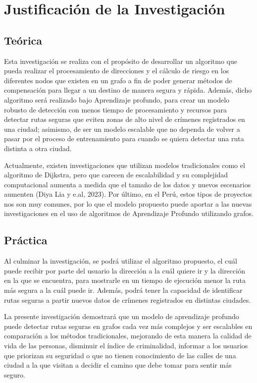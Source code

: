 \section{Justificación de la Investigación}

\subsection{Teórica}
Esta investigación se realiza con el propósito de desarrollar un algoritmo que pueda realizar el procesamiento de direcciones y el cálculo de riesgo en los diferentes nodos que existen en un grafo a fin de poder generar métodos de compensación para llegar a un destino de manera segura y rápida. Además, dicho algoritmo será realizado bajo Aprendizaje profundo, para crear un modelo robusto de detección con menos tiempo de procesamiento y recursos para detectar rutas seguras que eviten zonas de alto nivel de crímenes registrados en una ciudad; asimismo, de ser un modelo escalable que no dependa de volver a pasar por el proceso de entrenamiento para cuando se quiera detectar una ruta distinta a otra ciudad.

Actualmente, existen investigaciones que utilizan modelos tradicionales como el algoritmo de Dijkstra, pero que carecen de escalabilidad y su complejidad computacional aumenta a medida que el tamaño de los datos y nuevos escenarios aumenten (Diya Lia y e.al, 2023). Por último, en el Perú, estos tipos de proyectos nos son muy comunes, por lo que el modelo propuesto puede aportar a las nuevas investigaciones en el uso de algoritmos de Aprendizaje Profundo utilizando grafos. 

\subsection{Práctica}

Al culminar la investigación, se podrá utilizar el algoritmo propuesto, el cuál puede recibir por parte del usuario la dirección a la cuál quiere ir y la dirección en la que se encuentra, para mostrarle en un tiempo de ejecución menor la ruta más segura a la cuál puede ir. Además, podrá tener la capacidad de identificar rutas seguras a partir nuevos datos de crímenes registrados en distintas ciudades. 

La presente investigación demostrará que un modelo de aprendizaje profundo puede detectar rutas seguras en grafos cada vez más complejos y ser escalables en comparación a los métodos tradicionales, mejorando de esta manera la calidad de vida de las personas, disminuir el índice de criminalidad, informar a los usuarios que priorizan su seguridad o que no tienen conocimiento de las calles de una ciudad a la que visitan a decidir el camino que debe tomar para sentir más seguro.

